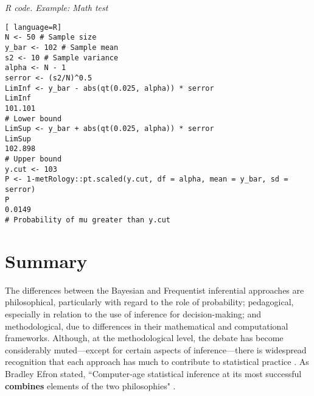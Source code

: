 \begin{tcolorbox}[enhanced,width=4.67in,center upper,
	fontupper=\large\bfseries,drop shadow southwest,sharp corners]
	\textit{R code. Example: Math test}
\begin{VF}
\begin{lstlisting}[ language=R]
N <- 50 # Sample size
y_bar <- 102 # Sample mean
s2 <- 10 # Sample variance
alpha <- N - 1
serror <- (s2/N)^0.5 
LimInf <- y_bar - abs(qt(0.025, alpha)) * serror
LimInf
101.101
# Lower bound
LimSup <- y_bar + abs(qt(0.025, alpha)) * serror
LimSup
102.898
# Upper bound
y.cut <- 103
P <- 1-metRology::pt.scaled(y.cut, df = alpha, mean = y_bar, sd = serror)
P
0.0149
# Probability of mu greater than y.cut
\end{lstlisting}
\end{VF}
\end{tcolorbox}



\section{Summary}\label{sec27}

The differences between the Bayesian and Frequentist inferential approaches are philosophical, particularly with regard to the role of probability; pedagogical, especially in relation to the use of inference for decision-making; and methodological, due to differences in their mathematical and computational frameworks. Although, at the methodological level, the debate has become considerably muted—except for certain aspects of inference—there is widespread recognition that each approach has much to contribute to statistical practice \cite{Good1992, Bayarri2004, Kass2011}. As Bradley Efron stated, ``Computer-age statistical inference at its most successful \textbf{combines} elements of the two philosophies" \cite{efron2016computer}.

